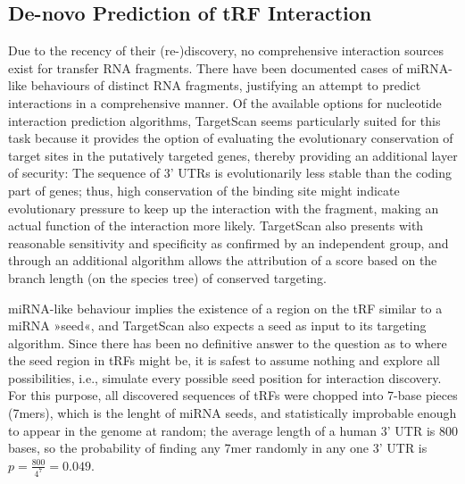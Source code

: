 \subsection{De-novo Prediction of tRF Interaction}
Due to the recency of their (re-)discovery, no comprehensive interaction sources exist for transfer RNA fragments. There have been documented cases of miRNA-like behaviours of distinct RNA fragments\cite{Cole2009,Kumar2014}, justifying an attempt to predict interactions in a comprehensive manner. Of the available options for nucleotide interaction prediction algorithms, TargetScan\cite{Friedman2009} seems particularly suited for this task because it provides the option of evaluating the evolutionary conservation of target sites in the putatively targeted genes, thereby providing an additional layer of security: The sequence of 3' UTRs is evolutionarily less stable than the coding part of genes; thus, high conservation of the binding site might indicate evolutionary pressure to keep up the interaction with the fragment, making an actual function of the interaction more likely. TargetScan also presents with reasonable sensitivity and specificity as confirmed by an independent group\cite{Alexiou2009}, and through an additional algorithm allows the attribution of a score based on the branch length (on the species tree) of conserved targeting\cite{Agarwal2015}.

miRNA-like behaviour implies the existence of a region on the tRF similar to a miRNA »seed«, and TargetScan also expects a seed as input to its targeting algorithm. Since there has been no definitive answer to the question as to where the seed region in tRFs might be, it is safest to assume nothing and explore all possibilities, i.e., simulate every possible seed position for interaction discovery. For this purpose, all discovered sequences of tRFs were chopped into 7-base pieces (7mers), which is the lenght of miRNA seeds, and statistically improbable enough to appear in the genome at random; the average length of a human 3' UTR is 800 bases, so the probability of finding any 7mer randomly in any one 3' UTR is $ p = \frac{800}{4^7} = 0.049 $.


